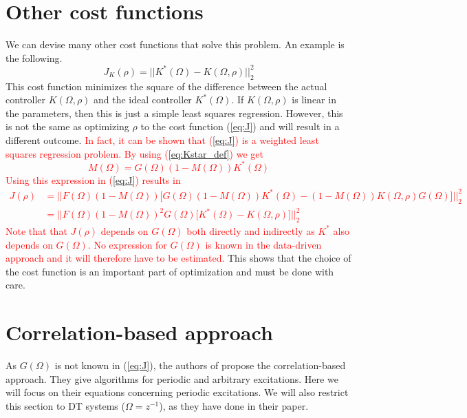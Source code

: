 \section{Other cost functions}
We can devise many other cost functions that solve this problem. An example is the following.
\begin{equation*}
    J_K(\rho) = ||K^*(\Omega)-K(\Omega,\rho)||_2^2
\end{equation*}
This cost function minimizes the square of the difference between the actual controller $K(\Omega,\rho)$ and the ideal controller $K^*(\Omega)$. If $K(\Omega,\rho)$ is linear in the parameters, then this is just a simple least squares regression. However, this is not the same as optimizing $\rho$ to the cost function (\ref{eq:J}) and will result in a different outcome. \textcolor{red}{In fact, it can be shown that (\ref{eq:J}) is a weighted least squares regression problem. By using (\ref{eq:Kstar_def}) we get
\begin{equation*}
    M(\Omega) = G(\Omega) (1-M(\Omega)) K^*(\Omega)
\end{equation*}
Using this expression in (\ref{eq:J}) results in
\begin{align*}
    J(\rho) & =  \Big|\Big|F(\Omega)(1-M(\Omega)) \Big[G(\Omega) (1-M(\Omega)) K^*(\Omega)-(1-M(\Omega))K(\Omega,\rho) G(\Omega)\Big]  \Big|\Big|_2^2 \\
    &= \Big|\Big|F(\Omega)(1-M(\Omega))^2 G(\Omega) \Big[ K^*(\Omega)-K(\Omega,\rho) \Big]  \Big|\Big|_2^2 
\end{align*}
Note that that $J(\rho)$ depends on $G(\Omega)$ both directly and indirectly as $K^*$ also depends on $G(\Omega)$. No expression for $G(\Omega)$ is known in the data-driven approach and it will therefore have to be estimated.}
This shows that the choice of the cost function is an important part of optimization and must be done with care.

\section{Correlation-based approach}
\label{sec:corr_based_approach}
As $G(\Omega)$ is not known in (\ref{eq:J}), the authors of \cite{Data-driven_model_reference_control} propose the correlation-based approach. They give algorithms for periodic and arbitrary excitations. Here we will focus on their equations concerning periodic excitations. We will also restrict this section to DT systems ($\Omega = z^{-1}$), as they have done in their paper.

